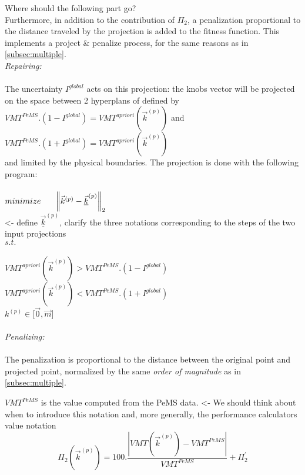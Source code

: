 \color{red} Where should the following part go? \color{black}\\
Furthermore, in addition to the contribution of $\Pi_{2}$, a penalization proportional to the distance traveled by the projection is added to the fitness function. This implements a project \& penalize process, for the same reasons as in \ref{subsec:multiple}.\\
\emph{Repairing:}\\
\\
The uncertainty $I^{global}$ acts on this projection: the knobs vector will be projected on the space between 2 hyperplans of   defined by\\
$VMT^{PeMS}.(1-I^{global})=VMT^{apriori}(\vec{k}^{(p)})$ and\\
$VMT^{PeMS}.(1+I^{global})=VMT^{apriori}(\vec{k}^{(p)})$\\
and limited by the physical boundaries.
The projection is done with the following program:\\
\\
$minimize \ \ \ \ \ \norm{\vec{k}^{(p)}-\underline{\vec{k}}^{(p)}}_{2}$\\ \color{red}<- define $\underline{\vec{k}}^{(p)}$, clarify the three notations corresponding to the steps of the two input projections\color{black}\\
$s.t.$\\
\\
$VMT^{apriori}(\vec{k}^{(p)})>VMT^{PeMS}.(1-I^{global})$\\
$VMT^{apriori}(\vec{k}^{(p)})<VMT^{PeMS}.(1+I^{global})$\\
$k^{(p)}\in{[\vec{0},\vec{m}}]$\\
\\
\emph{Penalizing:}\\
\\
The penalization is proportional to the distance between the original point and projected point, normalized by the same \emph{order of magnitude} as in \ref{subsec:multiple}.



$VMT^{PeMS}$ is the value computed from the PeMS data. \color{red}<- We should think about when to introduce this notation and, more generally, the performance calculators value notation \color{black}
\\
\begin{equation*}
	\Pi_{2}(\vec{k}^{(p)})=100.\frac{|VMT(\vec{k}^{(p)})-VMT^{PeMS}|}{VMT^{PeMS}}+\Pi_{2}^{'}
\end{equation*}
\\
\\